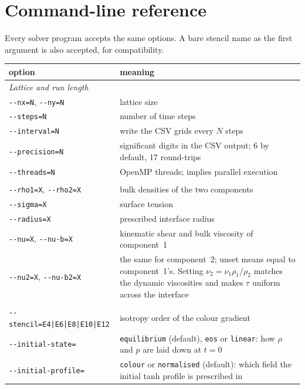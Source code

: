 \documentclass[11pt,a4paper]{article}
\theoremstyle{plain}
\theoremstyle{definition}
\begin{document}
\section{Command-line reference}
\label{sec:cli}

Every solver program accepts the same options. A bare stencil name as the first
argument is also accepted, for compatibility.

\begin{center}\small
\begin{tabular}{lp{9.2cm}}
\toprule
option & meaning \\
\midrule
\multicolumn{2}{l}{\emph{Lattice and run length}}\\
\texttt{-{-}nx=N}, \texttt{-{-}ny=N} & lattice size \\
\texttt{-{-}steps=N}      & number of time steps \\
\texttt{-{-}interval=N}   & write the CSV grids every $N$ steps \\
\texttt{-{-}precision=N}  & significant digits in the CSV output; 6 by default, 17 round-trips \\
\texttt{-{-}threads=N}    & OpenMP threads; implies parallel execution \\
\addlinespace
\multicolumn{2}{l}{\emph{Fluid properties}}\\
\texttt{-{-}rho1=X}, \texttt{-{-}rho2=X} & bulk densities of the two components \\
\texttt{-{-}sigma=X}      & surface tension \\
\texttt{-{-}radius=X}     & prescribed interface radius \\
\texttt{-{-}nu=X}, \texttt{-{-}nu-b=X}   & kinematic shear and bulk viscosity of component~1 \\
\texttt{-{-}nu2=X}, \texttt{-{-}nu-b2=X} & the same for component~2; unset means equal to component~1's. Setting $\nu_2 = \nu_1\rho_1/\rho_2$ matches the dynamic viscosities and makes $\tau$ uniform across the interface \\
\addlinespace
\multicolumn{2}{l}{\emph{Scheme}}\\
\texttt{-{-}stencil=E4|E6|E8|E10|E12} & isotropy order of the colour gradient \\
\texttt{-{-}initial-state=} & \texttt{equilibrium} (default), \texttt{eos} or \texttt{linear}: how $\rho$ and $p$ are laid down at $t=0$ \\
\texttt{-{-}initial-profile=} & \texttt{colour} or \texttt{normalised} (default): which field the initial tanh profile is prescribed in \\

\end{tabular}
\end{center}
\end{document}
